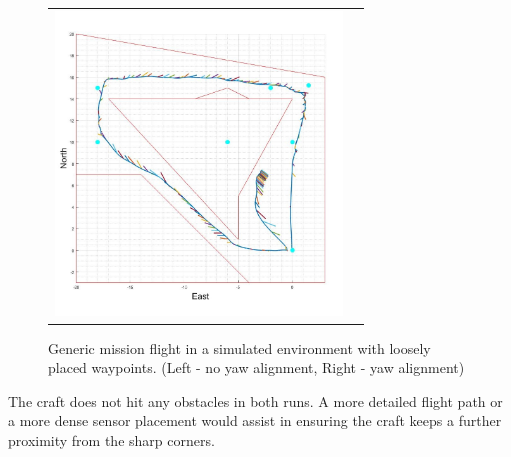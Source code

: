 \begin{figure}[H]
\begin{tabular}{c c}
				{\includegraphics[width = 3in]{../References/Testing/FullRunAlignProx.jpg}}\\
			\end{tabular}
			\caption{Generic mission flight in a simulated environment with loosely placed waypoints. (Left - no yaw alignment, Right - yaw alignment)}
			\label{IM_GenTest}
		\end{figure}
		
		The craft does not hit any obstacles in both runs. A more detailed flight path or a more dense sensor placement would assist in ensuring the craft keeps a further proximity from the sharp corners.
		
		
